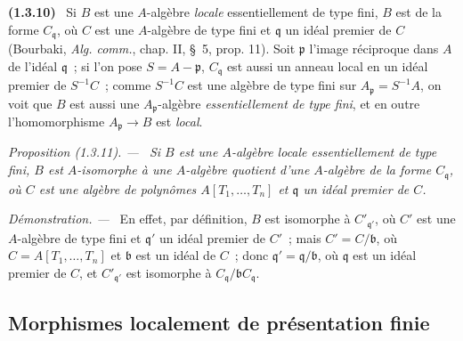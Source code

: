 \documentclass[10pt,oneside]{book}
\makeatletter
\newcommand{\setmanualcurrentlabel}[1]{\def\@currentlabel{#1}}
\newcommand{\oldpage}[2][]{%
  \setcounter{footnote}{0}%
  \marginpar{\scriptsize\textbf{#1}~|~#2}\ignorespaces}
\newenvironment{env}[1][]{\setmanualcurrentlabel{#1}\par\medskip\noindent\textbf{(#1)}\ }{\par}
\newenvironment{proposition}[1][]{%
  \setmanualcurrentlabel{#1}\par\medskip\noindent\itshape Proposition (#1). ---\ }{\par}
\newenvironment{proof}{%
  \par\medskip\noindent\textit{Démonstration. ---\ }}{\par}
\makeatother
\begin{document}
\oldpage[IV-1]{230}

\begin{env}[1.3.10]
\label{IV.1.3.10-fr}
Si $B$ est une $A$-algèbre \emph{locale} essentiellement de type fini, $B$ est
de la forme $C_{\mathfrak q}$, où $C$ est une $A$-algèbre de type fini et
$\mathfrak q$ un idéal premier de $C$ (Bourbaki, \emph{Alg. comm.}, chap. II,
\S~5, prop. 11). Soit $\mathfrak p$ l'image réciproque dans $A$ de l'idéal
$\mathfrak q$~; si l'on pose $S=A-\mathfrak p$, $C_{\mathfrak q}$ est aussi un
anneau local en un idéal premier de $S^{-1}C$~; comme $S^{-1}C$ est une
algèbre de type fini sur $A_{\mathfrak p}=S^{-1}A$, on voit que $B$ est aussi
une $A_{\mathfrak p}$-algèbre \emph{essentiellement de type fini}, et en outre
l'homomorphisme $A_{\mathfrak p}\to B$ est \emph{local}.
\end{env}

\begin{proposition}[1.3.11]
\label{IV.1.3.11-fr}
Si $B$ est une $A$-algèbre locale essentiellement de type fini, $B$ est
$A$-isomorphe à une $A$-algèbre quotient d'une $A$-algèbre de la forme
$C_{\mathfrak q}$, où $C$ est une algèbre de polynômes
$A[T_1,\ldots,T_n]$ et $\mathfrak q$ un idéal premier de $C$.
\end{proposition}

\begin{proof}
En effet, par définition, $B$ est isomorphe à $C'_{\mathfrak q'}$, où $C'$ est
une $A$-algèbre de type fini et $\mathfrak q'$ un idéal premier de $C'$~; mais
$C'=C/\mathfrak b$, où $C=A[T_1,\ldots,T_n]$ et $\mathfrak b$ est un idéal de
$C$~; donc $\mathfrak q'=\mathfrak q/\mathfrak b$, où $\mathfrak q$ est un
idéal premier de $C$, et $C'_{\mathfrak q'}$ est isomorphe à
$C_{\mathfrak q}/\mathfrak bC_{\mathfrak q}$.
\end{proof}

\subsection{Morphismes localement de présentation finie}
\label{subsection:IV.1.4-fr}
\end{document}
